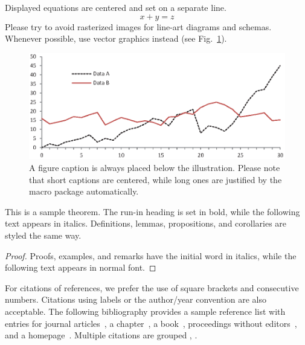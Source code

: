 \documentclass[runningheads,a4paper,hyper]{llncsrev}
\begin{document}
\noindent Displayed equations are centered and set on a separate
line.
\begin{equation}
  x + y = z
\end{equation}
Please try to avoid rasterized images for line-art diagrams and
schemas. Whenever possible, use vector graphics instead (see
Fig.~\ref{fig1}).

\begin{figure}
  \includegraphics[width=\textwidth]{fig1.eps}
  \caption{A figure caption is always placed below the illustration.
    Please note that short captions are centered, while long ones are
    justified by the macro package automatically.} \label{fig1}
\end{figure}

\begin{theorem}
  This is a sample theorem. The run-in heading is set in bold, while
  the following text appears in italics. Definitions, lemmas,
  propositions, and corollaries are styled the same way.
\end{theorem}
%
%
\begin{proof}
  Proofs, examples, and remarks have the initial word in italics,
  while the following text appears in normal font.
\end{proof}
For citations of references, we prefer the use of square brackets
and consecutive numbers. Citations using labels or the author/year
convention are also acceptable. The following bibliography provides
a sample reference list with entries for journal
articles~\cite{gridftp}, a chapter~\cite{peters2013chapter}, a
book~\cite{goodfellow2016deep}, proceedings without editors~\cite{apples1},
and a homepage~\cite{xilinxip}. Multiple citations are grouped
\cite{gridftp,peters2013chapter,goodfellow2016deep},
\cite{gridftp,goodfellow2016deep,apples1,xilinxip}.


\end{document}
